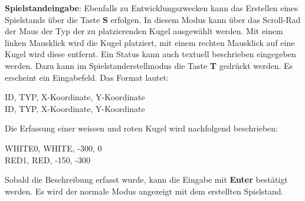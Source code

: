 \textbf{Spielstandeingabe}: Ebenfalls zu Entwicklungszwecken kann das Erstellen eines Spielstands über die Taste \textbf{S} erfolgen.
In diesem Modus kann über das Scroll-Rad der Maus der Typ der zu platzierenden Kugel ausgewählt werden. Mit einem linken Mausklick
wird die Kugel platziert, mit einem rechten Mausklick auf eine Kugel wird diese entfernt. Ein Status kann auch textuell beschrieben
eingegeben werden. Dazu kann im Spielstanderstellmodus die Taste \textbf{T} gedrückt werden. Es erscheint ein Eingabefeld.
Das Format lautet:
\begin{algorithm}[H]
    ID, TYP, X-Koordinate, Y-Koordinate\\
    ID, TYP, X-Koordinate, Y-Koordinate
\end{algorithm}
Die Erfassung einer weissen und roten Kugel wird nachfolgend beschrieben:\\
\begin{algorithm}[H]
    WHITE0, WHITE, -300, 0\\
    RED1, RED, -150, -300
\end{algorithm}
Sobald die Beschreibung erfasst wurde, kann die Eingabe mit \textbf{Enter} bestätigt werden. Es wird der normale Modus
angezeigt mit dem erstellten Spielstand.
